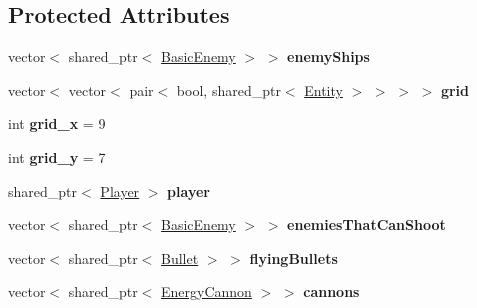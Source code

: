 \subsection*{Protected Attributes}
\begin{DoxyCompactItemize}
\item 
\mbox{\label{classGameLogic_1_1Level_a14aad8e997f07e966fa9d51567c6b36e}} 
vector$<$ shared\+\_\+ptr$<$ \hyperlink{classGameLogic_1_1BasicEnemy}{Basic\+Enemy} $>$ $>$ {\bfseries enemy\+Ships}
\item 
\mbox{\label{classGameLogic_1_1Level_a4eef9e6b732bf31eabd60484f030ec5a}} 
vector$<$ vector$<$ pair$<$ bool, shared\+\_\+ptr$<$ \hyperlink{classGameLogic_1_1Entity}{Entity} $>$ $>$ $>$ $>$ {\bfseries grid}
\item 
\mbox{\label{classGameLogic_1_1Level_af3af65172662d162fd1309f2c8286540}} 
int {\bfseries grid\+\_\+x} = 9
\item 
\mbox{\label{classGameLogic_1_1Level_aaef09f1a8d23bcea4d40716f43c85c8e}} 
int {\bfseries grid\+\_\+y} = 7
\item 
\mbox{\label{classGameLogic_1_1Level_a63e81c693d418fcc56cf38cb210ec812}} 
shared\+\_\+ptr$<$ \hyperlink{classGameLogic_1_1Player}{Player} $>$ {\bfseries player}
\item 
\mbox{\label{classGameLogic_1_1Level_a1b28ec0b0e9b7e0344dccf60e5c2668b}} 
vector$<$ shared\+\_\+ptr$<$ \hyperlink{classGameLogic_1_1BasicEnemy}{Basic\+Enemy} $>$ $>$ {\bfseries enemies\+That\+Can\+Shoot}
\item 
\mbox{\label{classGameLogic_1_1Level_a6c4303f858a3f1348cf20ae826449bd8}} 
vector$<$ shared\+\_\+ptr$<$ \hyperlink{classGameLogic_1_1Bullet}{Bullet} $>$ $>$ {\bfseries flying\+Bullets}
\item 
\mbox{\label{classGameLogic_1_1Level_ad5b6c9ea691cc3e5389fa02b027b6514}} 
vector$<$ shared\+\_\+ptr$<$ \hyperlink{classGameLogic_1_1EnergyCannon}{Energy\+Cannon} $>$ $>$ {\bfseries cannons}
\item 

\end{DoxyCompactItemize}
